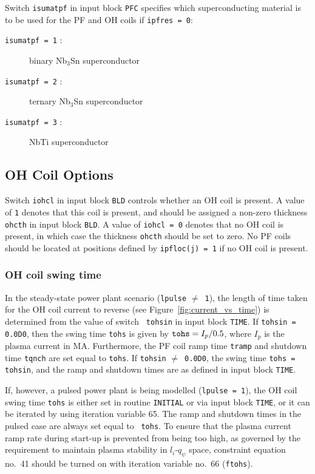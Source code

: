 Switch {\tt isumatpf} in input block {\tt PFC} specifies which superconducting
material is to be used for the PF and OH coils if {\tt ipfres = 0}:
\begin{description}
\item [{\tt isumatpf = 1} :] binary Nb$_3$Sn superconductor
\item [{\tt isumatpf = 2} :] ternary Nb$_3$Sn superconductor
\item [{\tt isumatpf = 3} :] NbTi superconductor
\end{description}

\subsection{OH Coil Options}

Switch {\tt iohcl} in input block {\tt BLD} controls whether an OH coil is
present. A value of {\tt 1} denotes that this coil is present, and should be
assigned a non-zero thickness {\tt ohcth} in input block {\tt BLD}. A value of
{\tt iohcl = 0} denotes that no OH coil is present, in which case the
thickness {\tt ohcth} should be set to zero. No PF coils should be located
at positions defined by {\tt ipfloc(j)~=~1} if no OH coil is present.

\subsubsection{OH coil swing time}
\label{sec:tohs}

In the steady-state power plant scenario ({\tt lpulse} $\not=$~{\tt 1}), the
length of time taken for the OH coil current to reverse (see
Figure~\ref{fig:current_vs_time}) is determined from the value of switch {\tt
tohsin} in input block {\tt TIME}. If {\tt tohsin = 0.0D0}, then the swing
time {\tt tohs} is given by $\mbox{\tt tohs} = I_p / 0.5$, where $I_p$ is the
plasma current in MA\@. Furthermore, the PF coil ramp time {\tt tramp} and
shutdown time {\tt tqnch} are set equal to {\tt tohs}.  If {\tt tohsin}
$\not=$~{\tt 0.0D0}, the swing time {\tt tohs = tohsin}, and the ramp and
shutdown times are as defined in input block {\tt TIME}.
\setlength{\parskip}{5mm}

If, however, a pulsed power plant is being modelled ({\tt lpulse = 1}), the OH
coil swing time {\tt tohs} is either set in routine {\tt INITIAL} or via input
block {\tt TIME}, or it can be iterated by using iteration variable 65. The
ramp and shutdown times in the pulsed case are always set equal to {\tt
tohs}. To ensure that the plasma current ramp rate during start-up is
prevented from being too high, as governed by the requirement to maintain
plasma stability in $l_i$-$q_\psi$ space, constraint equation no.\ 41 should
be turned on with iteration variable no.\ 66 ({\tt ftohs}).
\setlength{\parskip}{0mm}

